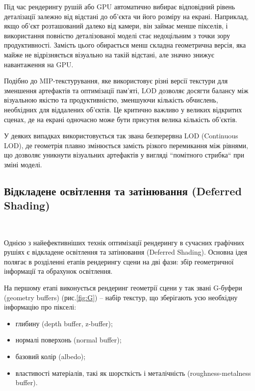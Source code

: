 \par Під час рендерингу рушій або GPU автоматично вибирає відповідний рівень деталізації залежно від відстані до об'єкта чи його розміру на екрані. Наприклад, якщо об'єкт розташований далеко від камери, він займає менше пік\-се\-лів, і використання повністю деталізованої моделі стає недоцільним з точ\-ки зору продуктивності. Замість цього обирається менш складна геометрична версія, яка майже не відрізняється візуально на такій відстані, але значно знижує навантаження на GPU.

\par Подібно до MIP-текстурування, яке використовує різні версії текстури для зменшення артефактів та оптимізації пам’яті, LOD дозволяє досягти балансу між візуальною якістю та продуктивністю, зменшуючи кількість обчислень, необхідних для віддалених об’єктів. Це критично важливо у великих відкритих сценах, де на екрані одночасно може бути присутня велика кількість об’єктів.

\par У деяких випадках використовується так звана безперервна LOD (Con\-ti\-nuous LOD), де геометрія плавно змінюється замість різкого перемикання між рівнями, що дозволяє уникнути візуальних артефактів у вигляді ``помітного стрибка`` при зміні моделі.

\subsection{Відкладене освітлення та затінювання (Deferred Shading)} \mbox{}\
\par Однією з найефективніших технік оптимізації рендерингу в сучасних графічних рушіях є відкладене освітлення та затінювання (Deferred Shading). Ос\-нов\-на ідея полягає в розділенні етапів рендерингу сцени на дві фази: збір геометричної інформації та обрахунок освітлення.

\par На першому етапі виконується рендеринг геометрії сцени у так звані G-буфери (geometry buffers) (рис.\ref{fig:G}) -- набір текстур, що зберігають усю необхідну інформацію про пікселі:
\begin{itemize}
\item глибину (depth buffer, z-buffer);
\item нормалі поверхонь (normal buffer);
\item базовий колір (albedo);
\item властивості матеріалів, такі як шорсткість і металічність (roughness-metalness buffer).
\end{itemize}

